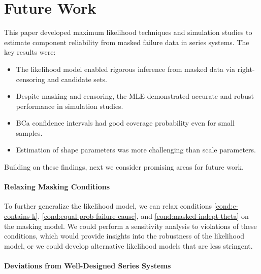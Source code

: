\documentclass[
]{article}
\providecommand{\tightlist}{%
  \setlength{\itemsep}{0pt}\setlength{\parskip}{0pt}}
\theoremstyle{definition}
\theoremstyle{plain}
\theoremstyle{definition}
\theoremstyle{definition}
\theoremstyle{definition}
\theoremstyle{definition}
\theoremstyle{remark}
\begin{document}
\hypertarget{future-work}{%
\section{Future Work}\label{future-work}}

This paper developed maximum likelihood techniques and simulation studies to
estimate component reliability from masked failure data in series systems. The
key results were:

\begin{itemize}
\tightlist
\item
  The likelihood model enabled rigorous inference from masked data via
  right-censoring and candidate sets.
\item
  Despite masking and censoring, the MLE demonstrated accurate and robust
  performance in simulation studies.
\item
  BCa confidence intervals had good coverage probability even for small samples.
\item
  Estimation of shape parameters was more challenging than scale parameters.
\end{itemize}

Building on these findings, next we consider promising areas for future work.

\hypertarget{relaxing-masking-conditions}{%
\paragraph*{Relaxing Masking Conditions}\label{relaxing-masking-conditions}}

To further generalize the likelihood model, we can relax conditions
\ref{cond:c-contains-k}, \ref{cond:equal-prob-failure-cause}, and
\ref{cond:masked-indept-theta} on the masking model. We could perform
a sensitivity analysis to violations of these conditions, which would provide
insights into the robustness of the likelihood model, or we could develop
alternative likelihood models that are less stringent.

\hypertarget{deviations-from-well-designed-series-systems}{%
\paragraph*{Deviations from Well-Designed Series Systems}\label{deviations-from-well-designed-series-systems}}
\end{document}

